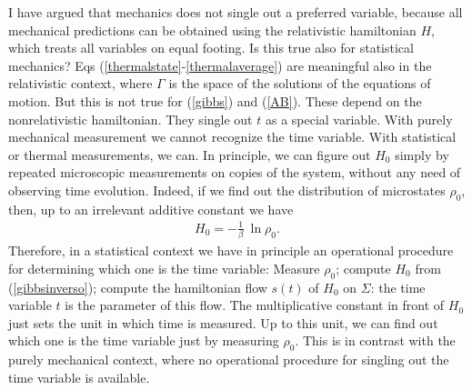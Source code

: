 \documentclass[10pt,nofootinbib]{revtex4}
\begin{document}
I have argued that mechanics does not
single out a preferred variable, because all mechanical predictions
can be obtained using the relativistic hamiltonian $H$, which treats
all variables on equal footing.  Is this true also for
statistical mechanics?  Eqs
(\ref{thermalstate}-\ref{thermalaverage}) are meaningful also in the
relativistic context, where $\Gamma$ is the space of the solutions of
the equations of motion.  But this is not true for 
(\ref{gibbs}) and (\ref{AB}).  These depend on the nonrelativistic
hamiltonian.  They single out $t$ as a special variable.  
With purely mechanical measurement we cannot recognize the time
variable.  With statistical or thermal measurements, we can.
In principle, we can figure out $H_{0}$ simply
by repeated microscopic measurements on copies of the system, without
any need of observing time evolution.  Indeed, if we find out the
distribution of microstates $\rho_{0}$, then, up to an irrelevant
additive constant we have
\begin{eqnarray}
H_0 = -\frac{1}{\beta}\ \ln \rho_{0}. 
\label{gibbsinverso}
\end{eqnarray}
Therefore, in a statistical context we have in principle an
operational procedure for determining which one is the time variable: 
Measure $\rho_{0}$; compute $H_{0}$ from
(\ref{gibbsinverso}); compute the hamiltonian flow $s(t)$ of
$H_{0}$ on $\Sigma$: the time variable $t$ is the parameter of this
flow.   The multiplicative constant in front of
$H_{0}$ just sets the unit in which time is measured.  Up to this
unit, we can find out which one is the time variable just by measuring
$\rho_{0}$. 
  This is in contrast with the purely mechanical
context, where no operational procedure for singling out the time
variable is available. 
\end{document}
